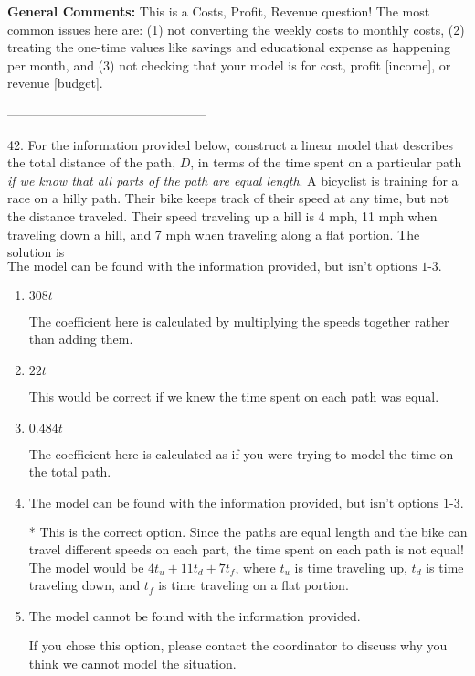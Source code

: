 \documentclass{extbook}[14pt]
\begin{document}
\textbf{General Comments:} This is a Costs, Profit, Revenue question! The most common issues here are: (1) not converting the weekly costs to monthly costs, (2) treating the one-time values like savings and educational expense as happening per month, and (3) not checking that your model is for cost, profit [income], or revenue [budget].

-----------------------------------------------

42. For the information provided below, construct a linear model that describes the total distance of the path, $D$, in terms of the time spent on a particular path \textit{if we know that all parts of the path are equal length}.
A bicyclist is training for a race on a hilly path. Their bike keeps track of their speed at any time, but not the distance traveled. Their speed traveling up a hill is 4 mph, 11 mph when traveling down a hill, and 7 mph when traveling along a flat portion. 
The solution is $ \text{The model can be found with the information provided, but isn't options 1-3.} $ 

\begin{enumerate}[label=\Alph*.] 
\item $ 308 t $ 

 The coefficient here is calculated by multiplying the speeds together rather than adding them. 
\item $ 22 t $ 

 This would be correct if we knew the time spent on each path was equal. 
\item $ 0.484 t $ 

 The coefficient here is calculated as if you were trying to model the time on the total path. 
\item $ \text{The model can be found with the information provided, but isn't options 1-3.} $ 

 * This is the correct option. Since the paths are equal length and the bike can travel different speeds on each part, the time spent on each path is not equal! The model would be $4t_u + 11t_d +7t_f$, where $t_u$ is time traveling up, $t_d$ is time traveling down, and $t_f$ is time traveling on a flat portion. 
\item $ \text{The model cannot be found with the information provided.} $ 

 If you chose this option, please contact the coordinator to discuss why you think we cannot model the situation. 
\end{enumerate} 
 
\end{document}
